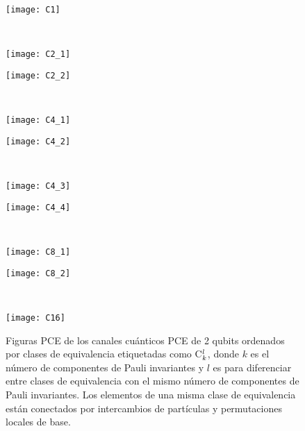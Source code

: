 \newpage
\begin{figure}[H]
\centering
\begin{minipage}[t]{0.49\textwidth}
	\centering
		\texttt{[image: C1]}
	\end{minipage} \\ \vspace{.25cm} 
	\begin{minipage}[b]{0.49\textwidth}
		\texttt{[image: C2\_1]}
	\end{minipage} \hfill
	\begin{minipage}[b]{0.49\textwidth}
		\texttt{[image: C2\_2]}
	\end{minipage} \\ \vspace{.25cm} 
	\begin{minipage}[b]{0.49\textwidth}
		\texttt{[image: C4\_1]}
	\end{minipage} \hfill
	\begin{minipage}[b][3.1cm]{0.49\textwidth}
		\texttt{[image: C4\_2]}
	\end{minipage} \\ \vspace{-.5cm} 
	\begin{minipage}[b]{0.49\textwidth}
		\texttt{[image: C4\_3]}
		\label{fig:C_4^3}
	\end{minipage} \hfill
	\begin{minipage}[b][5.1cm]{0.49\textwidth}
		\texttt{[image: C4\_4]}
	\end{minipage} \\ \vspace{-1.9cm} 
	\begin{minipage}[b]{0.49\textwidth}
		\texttt{[image: C8\_1]}
	\end{minipage} \hfill
	\begin{minipage}[b][5.1cm]{0.49\textwidth}
		\texttt{[image: C8\_2]}
		\label{fig:C_8^2}
	\end{minipage} \\	\vspace{.5cm} 
	\begin{minipage}[b]{0.49\textwidth}
	\centering
		\texttt{[image: C16]}
	\end{minipage}
	\caption{Figuras PCE de los canales cuánticos PCE de 2 qubits ordenados por 
	clases de equivalencia etiquetadas como C${}_{k}^{l}$, donde $k$ es el número 
	de componentes de Pauli invariantes y $l$ es para diferenciar entre clases 
	de equivalencia con el mismo número de componentes de Pauli invariantes.
	Los elementos de una misma clase de equivalencia están conectados por 
	intercambios de partículas y permutaciones locales de base. \ep}
	\label{fig:2qubits_PCEChannels_figs}
\end{figure} 
